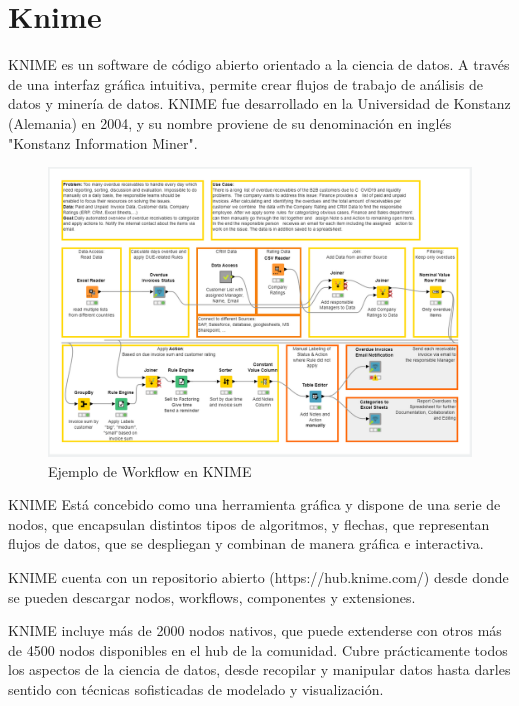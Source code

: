 
\section{Knime}

KNIME es un software de código abierto orientado a la ciencia de datos. A través de una interfaz gráfica intuitiva, 
permite crear flujos de trabajo de análisis de datos y minería de datos. KNIME fue desarrollado en la Universidad de 
Konstanz (Alemania) en 2004, y su nombre proviene de su denominación en inglés "Konstanz Information Miner"\cite{knime-whitepaper}. 
\

\begin{figure}[!h]
	\centering
	\includegraphics[width=1\textwidth]{img/3_ejemplo_workflow_knime.png}
	\caption{Ejemplo de Workflow en KNIME}
	\label{fig:ejemploworkflow}
\end{figure}
\FloatBarrier

KNIME Está concebido como una herramienta gráfica y dispone de una serie de nodos, que encapsulan distintos tipos de
 algoritmos, y flechas, que representan flujos de datos, que se despliegan y combinan de manera gráfica e interactiva.
\

KNIME cuenta con un repositorio abierto (https://hub.knime.com/) desde donde se pueden descargar nodos, workflows, componentes y extensiones. 
\

KNIME incluye más de 2000 nodos nativos, que puede extenderse con otros más de 4500 nodos disponibles en el hub 
de la comunidad. Cubre prácticamente todos los aspectos de la ciencia de datos, desde recopilar y manipular 
datos hasta darles sentido con técnicas sofisticadas de modelado y visualización.
\

